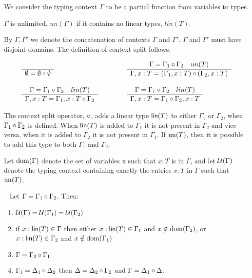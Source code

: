 We consider the typing context $\Gamma$ to be a partial function from variables to types.

$\Gamma$ is unlimited, $un(\Gamma)$ if it contains no linear types, $lin(T)$.

By $\Gamma, \Gamma'$ we denote the concatenation of contexts $\Gamma$ and $\Gamma'$. $\Gamma$ and $\Gamma'$ must have disjoint domains.
The definition of context split follows.


\begin{definition}
 \label{def:context_split}
 \vspace{-2mm}
 \[
	 \begin{array}{ll}

		 \tree{\\}{\econtext = \econtext \sessionop \econtext}{}
		 &
		 \qquad
		 \tree{\Gamma = \Gamma_1 \sessionop \Gamma_2 \andalso un(T)}{\Gamma, x: T = (\Gamma_1, x: T) \sessionop (\Gamma_2, x: T)  }{}
		 \\\\
		 \tree{\Gamma = \Gamma_1 \sessionop \Gamma_2 \andalso lin(T) }{\Gamma, x: T = \Gamma_1,x: T \sessionop \Gamma_2}{}
		 &
		 \qquad
		 \tree{\Gamma = \Gamma_1 \sessionop \Gamma_2 \andalso lin(T)}{\Gamma, x: T = \Gamma_1 \sessionop \Gamma_2,x: T}{}
	 \end{array}
 \]
\end{definition}
\vspace{-2mm}

The context split operator, $\circ$, adds a linear type $\mathsf{lin}(T)$ to either $\Gamma_1$ or $\Gamma_2$, when $\Gamma_1 \circ \Gamma_2$ is defined. When $\mathsf{lin}(T)$ is added to $\Gamma_1$ it is not present in $\Gamma_2$ and vice versa, when it is added to $\Gamma_2$ it is not present in $\Gamma_1$. If $\mathrm{un}(T)$, then it is possible to add this type to both $\Gamma_1$ and $\Gamma_2$.

Let $\mathrm{dom}(\Gamma)$ denote the set of variables x such that $x: T$ is in $\Gamma$, and let $\mathcal{U}(\Gamma)$ denote the typing context containing exactly the entries $x: T$ in $\Gamma$ such that $\mathrm{un}(T)$.

\begin{lemma}~\label{lmm:propertiesofctxsplit}
Let $\Gamma = \Gamma_1 \circ \Gamma_2$. Then:
\begin{enumerate}
  \item $\mathcal{U}(\Gamma) = \mathcal{U}(\Gamma_1) = \mathcal{U}(\Gamma_2)$
  \item if $x: \mathsf{lin}(T)\in \Gamma $ then either $x: \mathsf{lin}(T) \in \Gamma_1$ and $x \notin \mathrm{dom}(\Gamma_2) $, or $x: \mathsf{lin}(T) \in \Gamma_2$ and $x \notin \mathrm{dom}(\Gamma_1)$
  \item $\Gamma = \Gamma_2 \circ \Gamma_1$
  \item $\Gamma_1 = \Delta_1 \circ \Delta_2$ then $\Delta = \Delta_2 \circ \Gamma_2$ and $\Gamma = \Delta_1 \circ \Delta$.
\end{enumerate}
\end{lemma}


